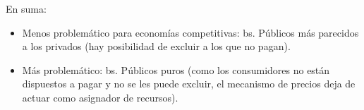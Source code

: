 \begin{frame}{En suma:}
	\begin{itemize}
		\item Menos problemático para economías competitivas: bs. Públicos más parecidos a los privados (hay posibilidad de excluir a los que no pagan).
		\item Más problemático: bs. Públicos puros (como los consumidores no están dispuestos a pagar y no se les puede excluir, el mecanismo de precios  deja de actuar como asignador de recursos).
	\end{itemize}
\end{frame}